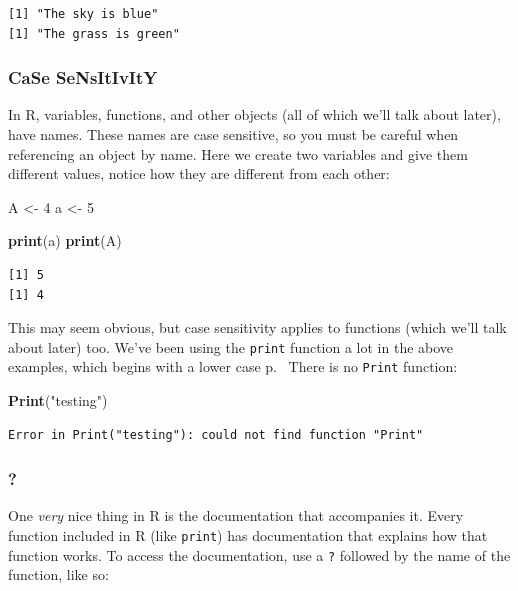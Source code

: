 \documentclass[
]{article}
\newenvironment{Shaded}{\begin{snugshade}}{\end{snugshade}}
\newcommand{\DecValTok}[1]{\textcolor[rgb]{0.00,0.00,0.81}{#1}}
\newcommand{\KeywordTok}[1]{\textcolor[rgb]{0.13,0.29,0.53}{\textbf{#1}}}
\newcommand{\NormalTok}[1]{#1}
\newcommand{\StringTok}[1]{\textcolor[rgb]{0.31,0.60,0.02}{#1}}
\begin{document}
\begin{verbatim}
[1] "The sky is blue"
[1] "The grass is green"
\end{verbatim}

\hypertarget{case-sensitivity}{%
\subsubsection{CaSe SeNsItIvItY}\label{case-sensitivity}}

In R, variables, functions, and other objects (all of which we'll talk about later), have names.
These names are case sensitive, so you must be careful when referencing an object by name.
Here we create two variables and give them different values, notice how they are different from each other:

\begin{Shaded}
\begin{Highlighting}[]
\NormalTok{A <-}\StringTok{ }\DecValTok{4}
\NormalTok{a <-}\StringTok{ }\DecValTok{5}

\KeywordTok{print}\NormalTok{(a)}
\KeywordTok{print}\NormalTok{(A)}
\end{Highlighting}
\end{Shaded}

\begin{verbatim}
[1] 5
[1] 4
\end{verbatim}

This may seem obvious, but case sensitivity applies to functions (which we'll talk about later) too.
We've been using the \texttt{print} function a lot in the above examples, which begins with a lower case p.~
There is no \texttt{Print} function:

\begin{Shaded}
\begin{Highlighting}[]
\KeywordTok{Print}\NormalTok{(}\StringTok{"testing"}\NormalTok{)}
\end{Highlighting}
\end{Shaded}

\begin{verbatim}
Error in Print("testing"): could not find function "Print"
\end{verbatim}

\hypertarget{section}{%
\subsubsection{?}\label{section}}

One \emph{very} nice thing in R is the documentation that accompanies it.
Every function included in R (like \texttt{print}) has documentation that explains how that function works.
To access the documentation, use a \texttt{?} followed by the name of the function, like so:
\end{document}
